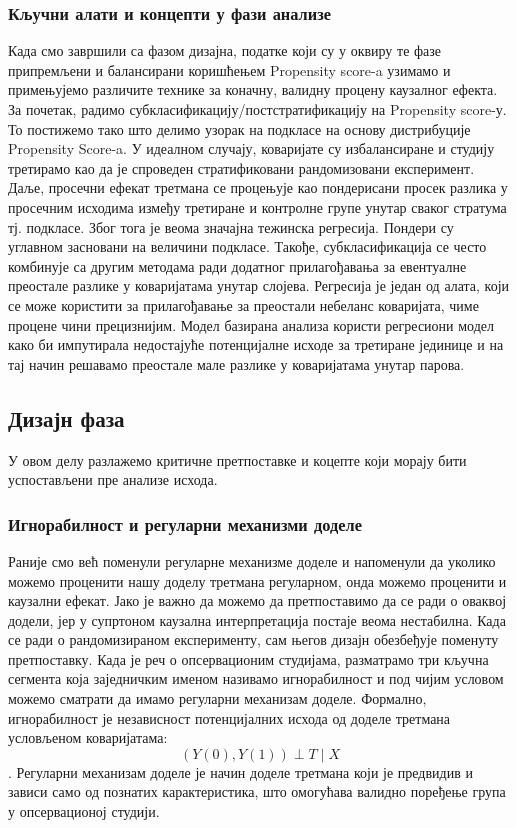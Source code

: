 \documentclass[12pt, a4paper]{article}
\begin{document}
\subsubsection{Кључни алати и концепти у фази анализе}
Када смо завршили са фазом дизајна, податке који су у оквиру те фазе припремљени и балансирани коришћењем Propensity score-a узимамо и примењујемо различите технике за коначну, валидну процену каузалног ефекта. За почетак, радимо субкласификацију/постстратификацију на Propensity score-у. То постижемо тако што делимо узорак на подкласе на основу дистрибуције  Propensity Score-a. У идеалном случају, коваријате су избалансиране и студију  третирамо као да је спроведен стратификовани рандомизовани експеримент. Даље, просечни ефекат третмана се процењује као пондерисани просек разлика у просечним исходима између третиране и контролне групе унутар сваког стратума тј. подкласе. Због тога је веома значајна тежинска регресија. Пондери су углавном засновани на величини подкласе. Такође, субкласификација се често комбинује са другим методама ради додатног прилагођавања за евентуалне преостале разлике у коваријатама унутар слојева. Регресија је један од алата, који се може користити за прилагођавање за преостали небеланс коваријата, чиме процене чини прецизнијим. Модел базирана анализа користи регресиони модел како би импутирала недостајуће потенцијалне исходе за третиране јединице и на тај начин решавамо преостале мале разлике у коваријатама унутар парова.

\subsection{Дизајн фаза}
У овом делу разлажемо критичне претпоставке и коцепте који морају бити успостављени пре анализе исхода. 

\subsubsection{Игнорабилност и регуларни механизми доделе}
Раније смо већ поменули регуларне механизме доделе и напоменули да уколико можемо проценити нашу доделу третмана регуларном, онда можемо проценити и каузални ефекат. Јако је важно да можемо да претпоставимо да се ради о оваквој додели, јер у супртоном каузална интерпретација постаје веома нестабилна. Када се ради о рандомизираном експерименту, сам његов дизајн обезбеђује поменуту претпоставку. Када је реч о опсервационим студијама, разматрамо три кључна сегмента која заједничким именом називамо игнорабилност и под чијим условом можемо сматрати да имамо регуларни механизам доделе. 
Формално, игнорабилност је независност потенцијалних исхода од доделе третмана условљеном коваријатама: $$(Y(0), Y(1)) \perp T \mid X$$. Регуларни механизам доделе је начин доделе третмана који је предвидив и зависи само од познатих карактеристика, што омогућава валидно поређење група у опсервационој студији.
\end{document}
